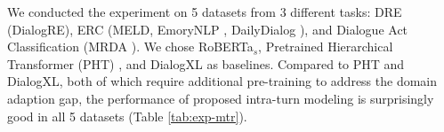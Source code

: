 


We conducted the experiment on 5 datasets from 3 different tasks: DRE (DialogRE), ERC (MELD, EmoryNLP \citep{zahiri:18a}, DailyDialog \citep{DailyDialog}), and Dialogue Act Classification (MRDA \citep{MRDA}). We chose RoBERTa$_s$, Pretrained Hierarchical Transformer (PHT) \citep{chapuis2020hierarchical}, and DialogXL \citep{DialogXL} as baselines. Compared to PHT and DialogXL, both of which require additional pre-training to address the domain adaption gap, the performance of proposed intra-turn modeling is surprisingly good in all 5 datasets (Table \ref{tab:exp-mtr}). 






